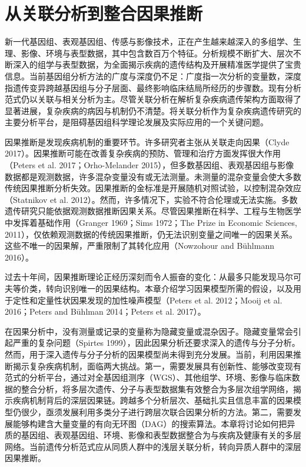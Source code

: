 \chapter{从关联分析到整合因果推断}
\label{ch:integrated-causal}

新一代基因组、表观基因组、传感与影像技术，正在产生越来越深入的多组学、生理、影像、环境与表型数据，其中包含数百万个特征。分析规模不断扩大、层次不断深入的组学与表型数据，为全面揭示疾病的遗传结构及开展精准医学提供了宝贵信息。当前基因组分析方法的广度与深度仍不足：广度指一次分析的变量数，深度指遗传变异跨越基因组与分子层面、最终影响临床结局所经历的步骤数。现有分析范式仍以关联与相关分析为主。尽管关联分析在解析复杂疾病遗传架构方面取得了显著进展，复杂疾病的病因与机制仍不清楚。将关联分析作为复杂疾病遗传研究的主要分析平台，是阻碍基因组科学理论发展及实际应用的一个关键问题。

因果推断是发现疾病机制的重要环节。许多研究者主张从关联走向因果（Clyde 2017）。因果推断可能在改善复杂疾病的预防、管理和治疗方面发挥很大作用（Peters et al. 2017；Orho-Melander 2015），但多数基因组、表观基因组与影像数据都是观测数据，许多混杂变量没有或无法测量。未测量的混杂变量会使大多数传统因果推断分析失效。因果推断的金标准是开展随机对照试验，以控制混杂效应（Statnikov et al. 2012）。然而，许多情况下，实验不符合伦理或无法实施。多数遗传研究只能依据观测数据推断因果关系。尽管因果推断在科学、工程与生物医学中发挥着基础作用（Granger 1969；Sims 1972；The Prize in Economic Sciences, 2011），仅依赖观测数据的传统因果推断，仍无法识别变量之间唯一的因果关系。这些不唯一的因果解，严重限制了其转化应用（Nowzohour and Bühlmann 2016）。

过去十年间，因果推断理论正经历深刻而令人振奋的变化：从最多只能发现马尔可夫等价类，转向识别唯一的因果结构。本章介绍学习因果模型所需的假设，以及用于定性和定量性状因果发现的加性噪声模型（Peters et al. 2012；Mooij et al. 2016；Peters and Bühlman 2014；Peters et al. 2017）。

在因果分析中，没有测量或记录的变量称为隐藏变量或混杂因子。隐藏变量常会引起严重的复杂问题（Spirtes 1999），因此因果分析还要求深入的遗传与分子分析。然而，用于深入遗传与分子分析的因果模型尚未得到充分发展。当前，利用因果推断揭示复杂疾病机制，面临两大挑战。第一，需要发展具有创新性、能够改变现有范式的分析平台，通过对全基因组测序（WGS）、其他组学、环境、影像与临床数据的整合分析，将多层次遗传、分子与表型数据集有效整合为多层次组学网络，揭示疾病机制背后的深层因果链。跨越多个分析层次、基础扎实且信息丰富的因果模型仍很少，亟须发展利用多类分子进行跨层次联合因果分析的方法。第二，需要发展能够构建含大量变量的有向无环图（DAG）的搜索算法。本章将讨论如何把异质的基因组、表观基因组、环境、影像和表型数据整合为与疾病及健康有关的多层网络。当前遗传分析范式应从同质人群中的浅层关联分析，转向异质人群中的深层因果推断。

